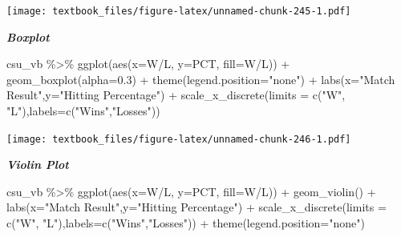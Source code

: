 \documentclass[
  11pt,
]{book}
\newenvironment{Shaded}{\begin{snugshade}}{\end{snugshade}}
\newcommand{\AttributeTok}[1]{\textcolor[rgb]{0.77,0.63,0.00}{#1}}
\newcommand{\FloatTok}[1]{\textcolor[rgb]{0.00,0.00,0.81}{#1}}
\newcommand{\FunctionTok}[1]{\textcolor[rgb]{0.00,0.00,0.00}{#1}}
\newcommand{\NormalTok}[1]{#1}
\newcommand{\SpecialCharTok}[1]{\textcolor[rgb]{0.00,0.00,0.00}{#1}}
\newcommand{\StringTok}[1]{\textcolor[rgb]{0.31,0.60,0.02}{#1}}
\theoremstyle{definition}
\theoremstyle{definition}
\theoremstyle{definition}
\theoremstyle{definition}
\theoremstyle{remark}
\begin{document}
\texttt{[image: textbook\_files/figure-latex/unnamed-chunk-245-1.pdf]}

\newpage

\textbf{\emph{Boxplot}}

\begin{Shaded}
\begin{Highlighting}[]
\NormalTok{csu\_vb }\SpecialCharTok{\%\textgreater{}\%} 
  \FunctionTok{ggplot}\NormalTok{(}\FunctionTok{aes}\NormalTok{(}\AttributeTok{x=}\StringTok{\textasciigrave{}}\AttributeTok{W/L}\StringTok{\textasciigrave{}}\NormalTok{, }\AttributeTok{y=}\NormalTok{PCT, }\AttributeTok{fill=}\StringTok{\textasciigrave{}}\AttributeTok{W/L}\StringTok{\textasciigrave{}}\NormalTok{)) }\SpecialCharTok{+} 
  \FunctionTok{geom\_boxplot}\NormalTok{(}\AttributeTok{alpha=}\FloatTok{0.3}\NormalTok{) }\SpecialCharTok{+}
  \FunctionTok{theme}\NormalTok{(}\AttributeTok{legend.position=}\StringTok{"none"}\NormalTok{) }\SpecialCharTok{+}
  \FunctionTok{labs}\NormalTok{(}\AttributeTok{x=}\StringTok{"Match Result"}\NormalTok{,}\AttributeTok{y=}\StringTok{"Hitting Percentage"}\NormalTok{) }\SpecialCharTok{+}
  \FunctionTok{scale\_x\_discrete}\NormalTok{(}\AttributeTok{limits =} \FunctionTok{c}\NormalTok{(}\StringTok{"W"}\NormalTok{, }\StringTok{"L"}\NormalTok{),}\AttributeTok{labels=}\FunctionTok{c}\NormalTok{(}\StringTok{"Wins"}\NormalTok{,}\StringTok{"Losses"}\NormalTok{))}
\end{Highlighting}
\end{Shaded}

\texttt{[image: textbook\_files/figure-latex/unnamed-chunk-246-1.pdf]}

\newpage

\textbf{\emph{Violin Plot}}

\begin{Shaded}
\begin{Highlighting}[]
\NormalTok{csu\_vb }\SpecialCharTok{\%\textgreater{}\%} \FunctionTok{ggplot}\NormalTok{(}\FunctionTok{aes}\NormalTok{(}\AttributeTok{x=}\StringTok{\textasciigrave{}}\AttributeTok{W/L}\StringTok{\textasciigrave{}}\NormalTok{, }\AttributeTok{y=}\NormalTok{PCT, }\AttributeTok{fill=}\StringTok{\textasciigrave{}}\AttributeTok{W/L}\StringTok{\textasciigrave{}}\NormalTok{)) }\SpecialCharTok{+} 
  \FunctionTok{geom\_violin}\NormalTok{() }\SpecialCharTok{+}
  \FunctionTok{labs}\NormalTok{(}\AttributeTok{x=}\StringTok{"Match Result"}\NormalTok{,}\AttributeTok{y=}\StringTok{"Hitting Percentage"}\NormalTok{) }\SpecialCharTok{+}
  \FunctionTok{scale\_x\_discrete}\NormalTok{(}\AttributeTok{limits =} \FunctionTok{c}\NormalTok{(}\StringTok{"W"}\NormalTok{, }\StringTok{"L"}\NormalTok{),}\AttributeTok{labels=}\FunctionTok{c}\NormalTok{(}\StringTok{"Wins"}\NormalTok{,}\StringTok{"Losses"}\NormalTok{)) }\SpecialCharTok{+} 
  \FunctionTok{theme}\NormalTok{(}\AttributeTok{legend.position=}\StringTok{"none"}\NormalTok{)}
\end{Highlighting}
\end{Shaded}
\end{document}
